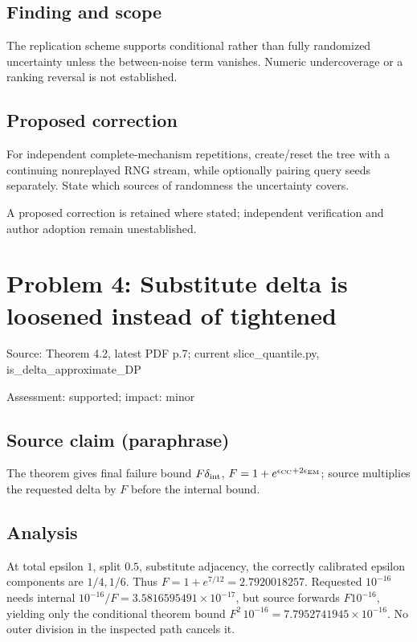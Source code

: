 \documentclass[11pt]{article}
\begin{document}
\subsection*{Finding and scope}

The replication scheme supports conditional rather than fully randomized uncertainty unless the between-noise term vanishes. Numeric undercoverage or a ranking reversal is not established.

\subsection*{Proposed correction}

For independent complete-mechanism repetitions, create/reset the tree with a continuing nonreplayed RNG stream, while optionally pairing query seeds separately. State which sources of randomness the uncertainty covers.

A proposed correction is retained where stated; independent verification and author adoption remain unestablished.

\section*{Problem 4: Substitute delta is loosened instead of tightened}

Source: Theorem 4.2, latest PDF p.7; current slice\_quantile.py, is\_delta\_approximate\_DP

Assessment: supported; impact: minor

\subsection*{Source claim (paraphrase)}

The theorem gives final failure bound \(F\delta_{\rm int}\), \(F=1+e^{\epsilon_{\rm CC}+2\epsilon_{\rm EM}}\); source multiplies the requested delta by \(F\) before the internal bound.

\subsection*{Analysis}

At total epsilon \(1\), split \(0.5\), substitute adjacency, the correctly calibrated epsilon components are \(1/4,1/6\). Thus \(F=1+e^{7/12}=2.7920018257\). Requested \(10^{-16}\) needs internal \(10^{-16}/F=3.5816595491\times10^{-17}\), but source forwards \(F10^{-16}\), yielding only the conditional theorem bound \(F^2\,10^{-16}=7.7952741945\times10^{-16}\). No outer division in the inspected path cancels it.
\end{document}
